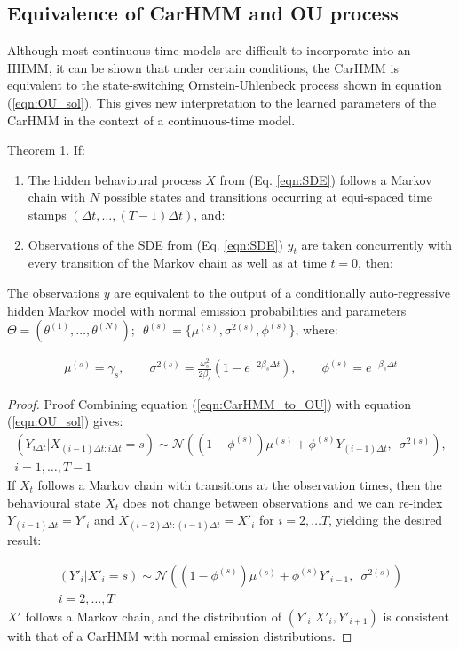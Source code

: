\subsection{Equivalence of CarHMM and OU process}

Although most continuous time models are difficult to incorporate into an HHMM, it can be shown that under certain conditions, the CarHMM is equivalent to the state-switching Ornstein-Uhlenbeck process shown in equation (\ref{eqn:OU_sol}). This gives new interpretation to the learned parameters of the CarHMM in the context of a continuous-time model.

\begin{theorem}{Theorem 1.}{}%
If:
\begin{enumerate}
    \item The hidden behavioural process $X$ from (Eq. \ref{eqn:SDE}) follows a Markov chain with $N$ possible states and transitions occurring at equi-spaced time stamps $\left(\Delta t, \ldots, (T-1)\Delta t\right)$, and:
    \item Observations of the SDE from (Eq. \ref{eqn:SDE}) $y_t$ are taken concurrently with every transition of the Markov chain as well as at time $t = 0$, then:
\end{enumerate}
The observations $y$ are equivalent to the output of a conditionally auto-regressive hidden Markov model with normal emission probabilities and parameters $\Theta = (\theta^{(1)}, \ldots, \theta^{(N)}); \enspace \theta^{(s)} = \{\mu^{(s)},\sigma^{2(s)},\phi^{(s)}\}$, where:

\begin{align}
\mu^{(s)} = \gamma_{s}, \qquad \sigma^{2(s)} = \frac{\omega_{s}^2}{2\beta_{s}} (1-e^{-2\beta_{s}\Delta t}), \qquad \phi^{(s)} = e^{-\beta_{s}\Delta t} \label{eqn:CarHMM_to_OU}
\end{align}

\end{theorem}
\begin{proof}{Proof}{}%
Combining equation (\ref{eqn:CarHMM_to_OU}) with equation (\ref{eqn:OU_sol}) gives:
%
\begin{align*}
\left(Y_{i \Delta t} | X_{(i-1)\Delta t: i \Delta t} = s \right) \sim \mathcal{N}\left((1-\phi^{(s)}) \mu^{(s)} + \phi^{(s)} Y_{(i-1) \Delta t}, \enspace \sigma^{2(s)} \right),\\
i = 1, \ldots, T-1
\end{align*}
%
If $X_t$ follows a Markov chain with transitions at the observation times, then the behavioural state $X_t$ does not change between observations and we can re-index $Y_{(i-1) \Delta t} = Y'_{i}$ and $X_{(i-2)\Delta t: (i-1) \Delta t} = X'_i$ for $i = 2,\ldots T$, yielding the desired result:

\begin{align*}
\left(Y'_{i} | X'_{i} = s \right) \sim \mathcal{N}\left((1-\phi^{(s)}) \mu^{(s)} + \phi^{(s)} Y'_{i-1}, \enspace \sigma^{2(s)} \right)\\
i = 2, \ldots, T
\end{align*}
%
$X'$ follows a Markov chain, and the distribution of $(Y'_i|X'_i,Y'_{i+1})$ is consistent with that of a CarHMM with normal emission distributions.
\end{proof}

